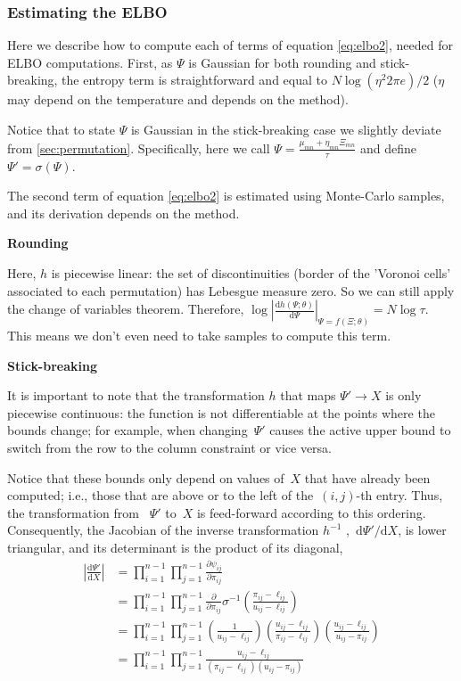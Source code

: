 \documentclass[twoside]{article}
\begin{document}
\subsubsection*{Estimating the ELBO} 
Here we describe how to compute each of terms of equation \eqref{eq:elbo2}, needed for ELBO computations. First, as $\Psi$ is Gaussian for both rounding and stick-breaking, the entropy term is straightforward and equal to $N\log(\eta^2 2\pi e )/2$ ($\eta$ may depend on the temperature and depends on the method). 

Notice that to state $\Psi$ is Gaussian in the stick-breaking case we slightly deviate from \ref{sec:permutation}. Specifically, here we call $\Psi=\frac{\mu_{mn} + \eta_{mn} \Xi_{mn}}{\tau} $ and define $\Psi' = \sigma(\Psi)$.

The second term of equation \eqref{eq:elbo2} is estimated using Monte-Carlo samples, and its derivation depends on the method. 

\textbf{Rounding}

Here, $h$ is piecewise linear: the set of discontinuities (border of the 'Voronoi cells' associated to each permutation) has Lebesgue measure zero. So we can still apply the change of variables theorem. Therefore, 
$\log \left| \frac{\mathrm{d}h(\Psi; \theta)}{\mathrm{d}\Psi} \right|_{\Psi = f(\Xi; \theta)}= N\log
\tau$. This means we don't even need to take samples to compute this term.


\textbf{Stick-breaking}

It is important to note that the transformation $h$ that maps $\Psi'\rightarrow X$ is only piecewise
continuous: the function is not differentiable at the points where
the bounds change; for example, when changing~$\Psi'$ causes the
active upper bound to switch from the row to the column constraint
or vice versa.  

Notice that these bounds only depend on values of~$X$ that
have already been computed; i.e., those that are above or to the left of
the~$(i,j)$-th entry. Thus, the transformation from ~$\Psi'$ to~$X$
is feed-forward according to this ordering.  Consequently, the
Jacobian of the inverse transformation $h^{-1}$ ,~$\mathrm{d}\Psi' / \mathrm{d} X$,
is lower triangular, and its determinant is the product of its diagonal,
\begin{align}
\nonumber \left| \frac{\mathrm{d} \Psi'} {\mathrm{d} X} \right|
&= \prod_{i=1}^{n-1} \prod_{j=1}^{n-1} \frac{\partial \psi_{ij} }{\partial {\pi}_{ij}} \\
\nonumber &= \prod_{i=1}^{n-1} \prod_{j=1}^{n-1} \frac{\partial}{\partial {\pi}_{ij}}
\sigma^{-1} \left( \frac{{\pi}_{ij} - \ell_{ij}}{u_{ij} - \ell_{ij}} \right ) \\
\nonumber &= \prod_{i=1}^{n-1} \prod_{j=1}^{n-1}
\left( \frac{1}{u_{ij} - \ell_{ij}} \right )
\left( \frac{u_{ij} - \ell_{ij}}{{\pi}_{ij} - \ell_{ij}} \right )
\left( \frac{u_{ij} - \ell_{ij}}{u_{ij} - {\pi}_{ij}} \right ) \\
\nonumber &= \prod_{i=1}^{n-1} \prod_{j=1}^{n-1}
\frac{u_{ij} - \ell_{ij}}{({\pi}_{ij} - \ell_{ij}) (u_{ij} - {\pi}_{ij})}
\end{align}
\end{document}
